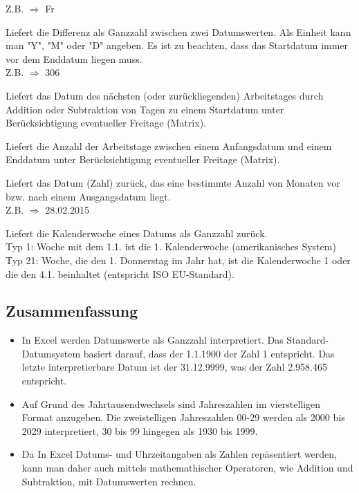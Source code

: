 \begin{description}[labelindent=0cm, leftmargin=7cm, font=\mdseries, labelwidth=5cm,style=nextline]
	Z.B.   $\Rightarrow$ Fr
\item[\stmt{DATEDIF(\syntax{Startdatum}; \syntax{Enddatum}; \syntax{Einheit})}] Liefert die Differenz als Ganzzahl zwischen zwei Datumswerten. Als Einheit kann man "Y", "M" oder "D" angeben. Es ist zu beachten, dass das Startdatum immer vor dem Enddatum liegen muss.\\
Z.B.  $\Rightarrow$ 306
\item[\stmt{ARBEITSTAG(\syntax{Startdatum};\syntax{Tage}; \syntax{Freitage}) }] Liefert das Datum des nächsten (oder zurückliegenden) Arbeitstages durch Addition oder Subtraktion von Tagen zu einem Startdatum unter Berücksichtigung eventueller Freitage (Matrix).
\item[\stmt{NETTOARBEITSTAGE(\syntax{Beginndatum}; \syntax{Enddatum}; \syntax{Freitage}) }] Liefert die Anzahl der Arbeitstage zwischen einem Anfangsdatum  und einem Enddatum unter Berücksichtigung eventueller Freitage (Matrix).
\item[\stmt{EDATUM(\syntax{Ausgangsdatum} ;\syntax{Monate})}] Liefert das Datum (Zahl) zurück, das eine bestimmte Anzahl von Monaten vor bzw. nach einem Ausgangsdatum liegt.\\
Z.B.  $\Rightarrow$ 28.02.2015
\item[\stmt{KALENDERWOCHE(\syntax{Datum}; \syntax{Typ}) }] Liefert die Kalenderwoche eines Datums als Ganzzahl zurück.\\
Typ 1: Woche mit dem 1.1. ist die 1. Kalenderwoche (amerikanisches System)\\
Typ 21: Woche, die den 1. Donnerstag im Jahr hat, ist die Kalenderwoche 1 oder die den 4.1. beinhaltet (entspricht ISO EU-Standard).
\end{description}



\subsection{Zusammenfassung}
\begin{itemize}
	\item In Excel werden Datumswerte als Ganzzahl interpretiert. Das Standard-Datumsystem basiert darauf, dass der 1.1.1900 der Zahl 1 entspricht. Das letzte interpretierbare Datum ist der 31.12.9999, was der Zahl 2.958.465 entspricht.
	\item Auf Grund des Jahrtausendwechsels sind Jahreszahlen im vierstelligen Format anzugeben. Die zweistelligen Jahreszahlen 00-29 werden als 2000 bis 2029 interpretiert, 30 bis 99 hingegen als 1930 bis 1999.

	\item Da In Excel Datums- und Uhrzeitangaben als Zahlen repäsentiert werden, kann man daher auch mittels mathemathischer Operatoren, wie Addition und Subtraktion, mit Datumswerten rechnen.	
	
\end{itemize}